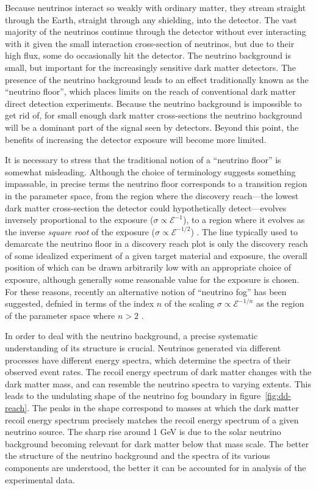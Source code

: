 \documentclass[b5paper, 10pt, twoside]{book}
\begin{document}
Because neutrinos interact so weakly with ordinary matter, they stream straight through the Earth, straight through any shielding, into the detector. The vast majority of the neutrinos continue through the detector without ever interacting with it given the small interaction cross-section of neutrinos, but due to their high flux, some do occasionally hit the detector. The neutrino background is small, but important for the increasingly sensitive dark matter detectors. The presence of the neutrino background leads to an effect traditionally known as the ``neutrino floor'', which places limits on the reach of conventional dark matter direct detection experiments. Because the neutrino background is impossible to get rid of, for small enough dark matter cross-sections the neutrino background will be a dominant part of the signal seen by detectors. Beyond this point, the benefits of increasing the detector exposure will become more limited.

It is necessary to stress that the traditional notion of a ``neutrino floor'' is somewhat misleading. Although the choice of terminology suggests something impassable, in precise terms the neutrino floor corresponds to a transition region in the parameter space, from the region where the discovery reach---the lowest dark matter cross-section the detector could hypothetically detect---evolves inversely proportional to the exposure ($\sigma\propto \mathcal{E}^{-1}$), to a region where it evolves as the inverse \emph{square root} of the exposure ($\sigma\propto \mathcal{E}^{-1/2}$) \parencite{BillardFigueroaFelicianoStrigari2014}. The line typically used to demarcate the neutrino floor in a discovery reach plot is only the discovery reach of some idealized experiment of a given target material and exposure, the overall position of which can be drawn arbitrarily low with an appropriate choice of exposure, although generally some reasonable value for the exposure is chosen. For these reasons, recently an alternative notion of ``neutrino fog'' has been suggested, defnied in terms of the index $n$ of the scaling $\sigma\propto \mathcal{E}^{-1/n}$ as the region of the parameter space where $n>2$ \parencites{OHare2021, CarewEtAl2024}.

In order to deal with the neutrino background, a precise systematic understanding of its structure is crucial. Neutrinos generated via different processes have different energy spectra, which determine the spectra of their observed event rates. The recoil energy spectrum of dark matter changes with the dark matter mass, and can resemble the neutrino spectra to varying extents. This leads to the undulating shape of the neutrino fog boundary in figure~\ref{fig:dd-reach}. The peaks in the shape correspond to masses at which the dark matter recoil energy spectrum precisely matches the recoil energy spectrum of a given neutrino source. The sharp rise around 1 GeV is due to the solar neutrino background becoming relevant for dark matter below that mass scale. The better the structure of the neutrino background and the spectra of its various components are understood, the better it can be accounted for in analysis of the experimental data.
\end{document}
